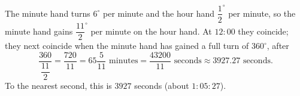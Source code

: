 The minute hand turns $6^\circ$ per minute and the hour hand $\dfrac{1}{2}^\circ$ per minute, so the minute hand gains $\dfrac{11}{2}^\circ$ per minute on the hour hand. At $12{:}00$ they coincide; they next coincide when the minute hand has gained a full turn of $360^\circ$, after
\[
\dfrac{360}{\dfrac{11}{2}}=\dfrac{720}{11}=65\dfrac{5}{11}\text{ minutes}=\dfrac{43200}{11}\text{ seconds}\approx3927.27\text{ seconds}.
\]
To the nearest second, this is $\boxed{3927}$ seconds (about $1{:}05{:}27$).

